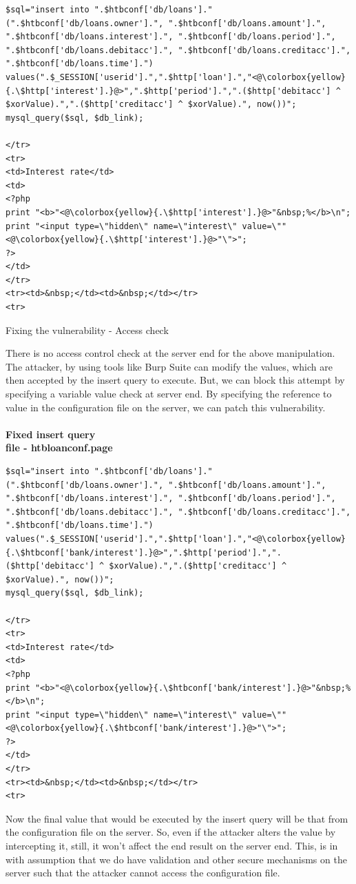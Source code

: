 \documentclass[12pt]{report}
\begin{document}
	\begin{lstlisting}[breaklines=true]
$sql="insert into ".$htbconf['db/loans']." (".$htbconf['db/loans.owner'].", ".$htbconf['db/loans.amount'].", ".$htbconf['db/loans.interest'].", ".$htbconf['db/loans.period'].", ".$htbconf['db/loans.debitacc'].", ".$htbconf['db/loans.creditacc'].", ".$htbconf['db/loans.time'].") values(".$_SESSION['userid'].",".$http['loan'].","<@\colorbox{yellow}{.\$http['interest'].}@>",".$http['period'].",".($http['debitacc'] ^ $xorValue).",".($http['creditacc'] ^ $xorValue).", now())";
mysql_query($sql, $db_link);

</tr>
<tr>
<td>Interest rate</td>
<td>
<?php
print "<b>"<@\colorbox{yellow}{.\$http['interest'].}@>"&nbsp;%</b>\n";
print "<input type=\"hidden\" name=\"interest\" value=\""<@\colorbox{yellow}{.\$http['interest'].}@>"\">";
?>
</td>
</tr>
<tr><td>&nbsp;</td><td>&nbsp;</td></tr>
<tr>
	\end{lstlisting}
	
	
	Fixing the vulnerability - Access check 
	
	There is no access control check at the server end for the above manipulation. The attacker, by using tools like Burp Suite can modify the values, which are then accepted by the insert query to execute. But, we can block this attempt by specifying a variable value check at server end. 
	By specifying the reference to value in the configuration file on the server, we can patch this vulnerability.\\\\
	{\bf Fixed insert query}\\
	{\bf file - htbloanconf.page }\\
	
	\begin{lstlisting}[breaklines=true]
$sql="insert into ".$htbconf['db/loans']." (".$htbconf['db/loans.owner'].", ".$htbconf['db/loans.amount'].", ".$htbconf['db/loans.interest'].", ".$htbconf['db/loans.period'].", ".$htbconf['db/loans.debitacc'].", ".$htbconf['db/loans.creditacc'].", ".$htbconf['db/loans.time'].") values(".$_SESSION['userid'].",".$http['loan'].","<@\colorbox{yellow}{.\$htbconf['bank/interest'].}@>",".$http['period'].",".($http['debitacc'] ^ $xorValue).",".($http['creditacc'] ^ $xorValue).", now())";
mysql_query($sql, $db_link);

</tr>
<tr>
<td>Interest rate</td>
<td>
<?php
print "<b>"<@\colorbox{yellow}{.\$htbconf['bank/interest'].}@>"&nbsp;%</b>\n";
print "<input type=\"hidden\" name=\"interest\" value=\""<@\colorbox{yellow}{.\$htbconf['bank/interest'].}@>"\">";
?>
</td>
</tr>
<tr><td>&nbsp;</td><td>&nbsp;</td></tr>
<tr>
	\end{lstlisting}
	Now the final value that would be executed by the insert query will be that from the configuration file on the server. So, even if the attacker alters the value by intercepting it, still, it won't affect the end result on the server end. This, is in with assumption that we do have validation and other secure mechanisms on the server such that the attacker cannot access the configuration file.\\
	
\end{document}
